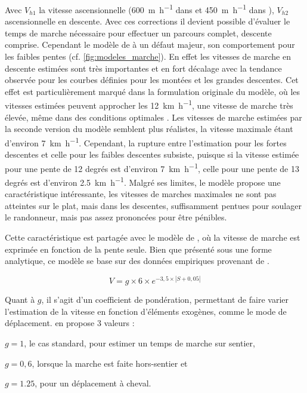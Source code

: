 Avec \(V_{h1}\) la vitesse ascensionnelle (\SI{600}{\meter\per\hour}
dans \textcite{Langmuir1984} et \SI{450}{\meter\per\hour} dans
\textcite{Langmuir2013}), \(V_{h2}\) ascensionnelle en descente. Avec
ces corrections il devient possible d'évaluer le temps de marche
nécessaire pour effectuer un parcours complet, descente
comprise.
Cependant le modèle de  à un défaut majeur, son
comportement pour les faibles pentes
(cf. \autoref{fig:modeles_marche}). En effet les vitesses de marche en
descente estimées sont très importantes et en fort décalage avec la
tendance observée pour les courbes définies pour les montées et les
grandes descentes. Cet effet est particulièrement marqué dans la
formulation originale du modèle, où les vitesses estimées peuvent
approcher les \SI{12}{\kilo\meter\per\hour}, une vitesse de marche
très élevée, même dans des conditions optimales
\autocite{Kerouanton2020}. Les vitesses de marche estimées par la
seconde version du modèle \autocite{Langmuir2013} semblent plus
réalistes, la vitesse maximale étant d'environ
\SI{7}{\kilo\meter\per\hour}. Cependant, la rupture entre l'estimation
pour les fortes descentes et celle pour les faibles descentes
subsiste, puisque si la vitesse estimée pour une pente de 12 degrés
est d'environ \SI{7}{\kilo\meter\per\hour}, celle pour une pente de 13
degrés est d'environ \SI{2,5}{\kilo\meter\per\hour}. Malgré ses
limites, le modèle  propose une caractéristique
intéressante, les vitesses de marches maximales ne sont pas atteintes
sur le plat, mais dans les descentes, suffisamment pentues pour
soulager le randonneur, mais pas assez prononcées pour être pénibles.

Cette caractéristique est partagée avec le modèle de
\textcite{Tobler1993}, où la vitesse de marche est exprimée en
fonction de la pente seule. Bien que présenté sous une forme
analytique, ce modèle se base sur des données empiriques provenant de
\textcite{Imhof1950} \autocite{Tobler1993}.

\begin{equation}
  \label{eq:marche_tobler}
  V = g × 6 × e^{-3,5 × \left| S + 0,05 \right|}
\end{equation}

Quant à \(g\), il s'agit d'un coefficient de
pondération, permettant de faire varier l'estimation de la vitesse en
fonction d'éléments exogènes, comme le mode de
déplacement. \textcite{Tobler1993} en propose 3 valeurs :
%
\begin{enumerate*}[label=(\alph*)]
\item \(g = 1\), le cas standard, pour estimer un temps de marche sur
  sentier,
\item \(g = 0,6\), lorsque la marche est faite hors-sentier et
\item  \(g = 1.25\), pour un déplacement à cheval.
\end{enumerate*}

